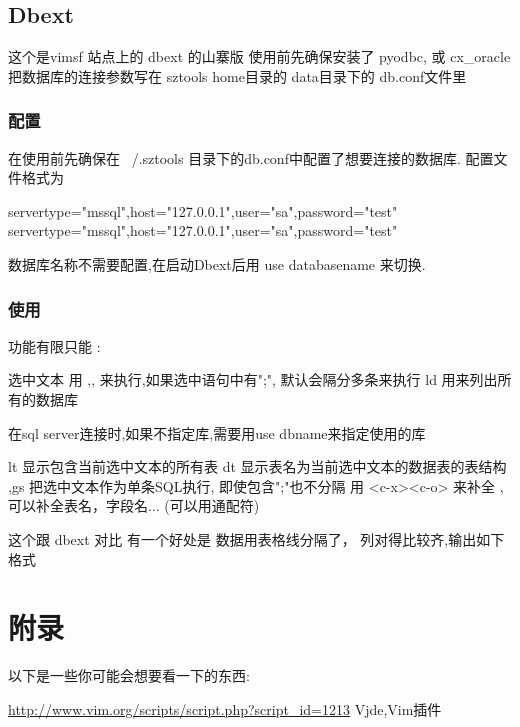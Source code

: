 \documentclass[oneside,openany]{book}
\begin{document}
\section{Dbext}

这个是vimsf 站点上的 dbext 的山寨版
使用前先确保安装了 pyodbc, 或 cx\_oracle 把数据库的连接参数写在 sztools home目录的 data目录下的 db.conf文件里

\subsection{配置}
   在使用前先确保在 ~/.sztools 目录下的db.conf中配置了想要连接的数据库.
   配置文件格式为
    \begin{mdframed}[style=SmallFrame]
    \begin{flushleft}
    servertype="mssql",host="127.0.0.1",user="sa",password="test"\newline
    servertype="mssql",host="127.0.0.1",user="sa",password="test"
    \end{flushleft}
    \end{mdframed}
    数据库名称不需要配置,在启动Dbext后用 use databasename 来切换.

\subsection{使用}
功能有限只能 :

    选中文本
    用 ,, 来执行,如果选中语句中有";", 默认会隔分多条来执行
    ld 用来列出所有的数据库

        在sql server连接时,如果不指定库,需要用use dbname来指定使用的库 

    lt 显示包含当前选中文本的所有表
    dt 显示表名为当前选中文本的数据表的表结构
    ,gs 把选中文本作为单条SQL执行, 即使包含";"也不分隔
    用 <c-x><c-o> 来补全 , 可以补全表名，字段名... (可以用通配符) 

   这个跟 dbext 对比 有一个好处是 数据用表格线分隔了， 列对得比较齐,输出如下格式 


\chapter{附录}
  以下是一些你可能会想要看一下的东西:
  \newline

  \href{http://www.vim.org/scripts/script.php?script\_id=1213}{http://www.vim.org/scripts/script.php?script\_id=1213} 
  Vjde,Vim插件
  \newline
\end{document}
